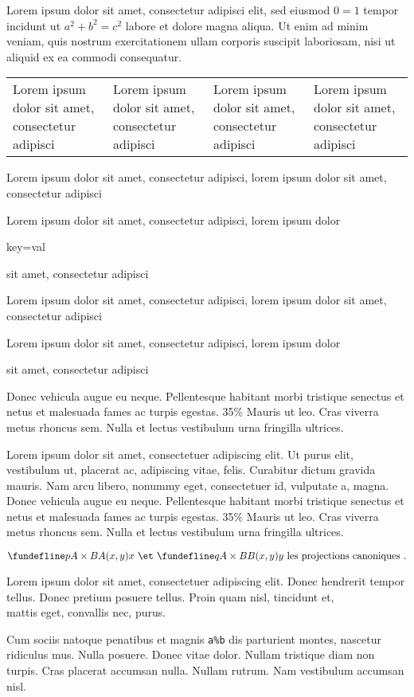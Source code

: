 Lorem ipsum dolor sit amet, consectetur adipisci elit, sed eiusmod
\(0 = 1\) tempor incidunt ut $a^{2} + b^{2} = c^{2}$ labore et dolore
magna aliqua.  Ut enim ad minim veniam, quis nostrum exercitationem
ullam corporis suscipit laboriosam, nisi ut aliquid ex ea commodi
consequatur.

\begin{tabular}{| l | l | l | l |}
  Lorem ipsum dolor sit amet, consectetur adipisci & Lorem ipsum dolor sit amet, consectetur adipisci & Lorem ipsum dolor sit amet, consectetur adipisci & Lorem ipsum dolor sit amet, consectetur adipisci
\end{tabular}

Lorem ipsum dolor sit amet, consectetur adipisci, lorem ipsum dolor
\captionsetup{key=val} sit amet, consectetur adipisci

Lorem ipsum dolor sit amet, consectetur adipisci, lorem ipsum dolor
\caption{key=val}
sit amet, consectetur adipisci

Lorem ipsum dolor sit amet, consectetur adipisci, lorem ipsum dolor
\parencite{key} sit amet, consectetur adipisci

Lorem ipsum dolor sit amet, consectetur adipisci, lorem ipsum dolor
\par
sit amet, consectetur adipisci

Donec vehicula augue eu neque.  Pellentesque habitant morbi tristique
senectus et netus et malesuada fames ac turpis egestas.
35\% %
Mauris ut leo.  Cras viverra metus rhoncus sem.  Nulla et lectus
vestibulum urna fringilla ultrices.

Lorem ipsum dolor sit amet, consectetuer adipiscing elit.  Ut purus
elit, vestibulum ut, placerat ac, adipiscing vitae, felis.  Curabitur
dictum gravida mauris.  Nam arcu libero, nonummy eget, consectetuer
id, vulputate a, magna.  Donec vehicula augue eu neque.  Pellentesque
habitant morbi tristique senectus et netus et malesuada fames ac
turpis egestas. 35\%%
Mauris ut leo.  Cras viverra metus rhoncus sem.  Nulla et lectus
vestibulum urna fringilla ultrices.

$$ \fundefline p{A \times B}{A}{(x,y)}{x}\ %
\et\ \fundefline q{A \times B}{B}{(x,y)}{y}\ %
\text{les projections canoniques}\ .$$

Lorem ipsum dolor sit amet, consectetuer adipiscing elit. Donec
hendrerit tempor tellus. Donec pretium posuere tellus. Proin quam
nisl, tincidunt et, \\%
mattis eget, convallis nec, purus.

Cum sociis natoque penatibus et magnis \verb|a%b| dis parturient
montes, nascetur ridiculus mus. Nulla posuere. Donec vitae
dolor. Nullam tristique diam non turpis.  Cras placerat accumsan
nulla. Nullam rutrum. Nam vestibulum accumsan nisl.
